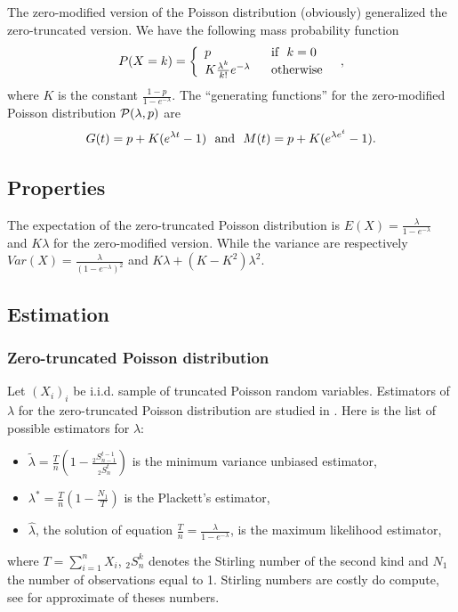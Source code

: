 The zero-modified version of the Poisson distribution (obviously) generalized the zero-truncated version. We have the following mass probability function
$$
P(X=k)=\left\{
\begin{array}{ll}
p & \textrm{~~if~~} k=0\\
K\frac{\lambda^k}{k!} e^{-\lambda} & \textrm{~~otherwise~~}
\end{array}
\right.
,
$$
where $K$ is the constant $\frac{1-p}{1-e^{-\lambda}}$. The ``generating functions'' for the zero-modified Poisson distribution $\mathcal P(\lambda, p)$ are
$$
G(t)=p+K(e^{\lambda t}-1) \textrm{~~and~~} M(t)=p+K(e^{\lambda e^t}-1).
$$


\subsection{Properties}
The expectation of the zero-truncated Poisson distribution is $E(X)=\frac{\lambda}{1-e^{-\lambda}}$ and $K\lambda$ for the zero-modified version. While the variance are respectively $Var(X)=\frac{\lambda}{(1-e^{-\lambda})^2}$ and $K \lambda+(K-K^2)\lambda^2$.

\subsection{Estimation}
\subsubsection{Zero-truncated Poisson distribution}
Let $(X_i)_i$ be i.i.d. sample of truncated Poisson random variables.
Estimators of $\lambda$ for the zero-truncated Poisson distribution are studied in \cite{tategoen}. Here is the list of possible estimators for $\lambda$:
\begin{itemize}
\item $\tilde \lambda = \frac{T}{n}(1-\frac{{}_2S_{n-1}^{t-1}}{{}_2S_{n}^{t}})$ is the minimum variance unbiased estimator,
\item $ \lambda^* = \frac{T}{n}(1-\frac{N_1}{T})$ is the Plackett's estimator,
\item $\hat\lambda$, the solution of equation $\frac{T}{n}=\frac{\lambda}{1-e^{-\lambda}}$, is the maximum likelihood estimator,
\end{itemize}
where $T=\sum_{i=1}^nX_i$, ${}_2S_{n}^{k}$ denotes the Stirling number of the second kind and $N_1$ the number of observations equal to 1. Stirling numbers are costly do compute, see \cite{tategoen} for approximate of theses numbers.

